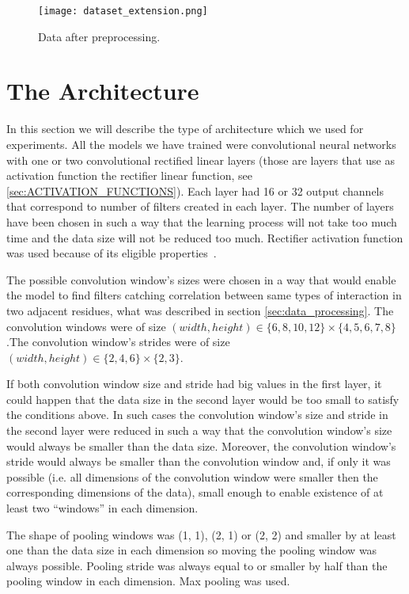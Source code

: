 \documentclass[a4paper,10pt]{report}
\begin{document}
	  \begin{figure}[h!]
	    \centering
	    \texttt{[image: dataset\_extension.png]}
	    \caption{Data after preprocessing.}
	    \label{fig:extended_data}
	  \end{figure}
	  	
      \section{The Architecture}
      In this section we will describe the type of architecture which we used for experiments. All the models we have trained were convolutional neural networks with one or two convolutional rectified linear layers (those are layers that use as activation function the rectifier linear function, see \ref{sec:ACTIVATION_FUNCTIONS}). Each layer had 16 or 32 output channels that correspond to number of filters created in each layer. The number of layers have been chosen in such a way that the learning process will not take too much time and the data size will not be reduced too much. Rectifier activation function was used because of its eligible properties~\cite{DUTCH}.  
   
      The possible convolution window's sizes were chosen in a way that would enable the model to find filters catching correlation between same types of interaction in two adjacent residues, what was described in section \ref{sec:data_processing}. The convolution windows were of size $(width, height) \in \{6, 8, 10, 12\} \times \{4, 5, 6, 7, 8\}$.The convolution window's strides were of size $(width, height) \in \{2, 4, 6\} \times \{2, 3\}$. 
      
      If both convolution window size and stride had big values in the first layer, it could happen that the data size in the second layer would be too small to satisfy the conditions above. In such cases the convolution window's size and stride in the second layer were reduced in such a way that the convolution window's size would always be smaller than the data size. Moreover, the convolution window's stride would always be smaller than the convolution window and, if only it was possible (i.e. all dimensions of the convolution window were smaller then the corresponding dimensions of the data), small enough to enable existence of at least two ``windows'' in each dimension. 
      
      The shape of pooling windows was (1, 1), (2, 1) or (2, 2) and smaller by at least one than the data size in each dimension so moving the pooling window was always possible. Pooling stride was always equal to or smaller by half than the pooling window in each dimension. Max pooling was used. 
      
\end{document}
